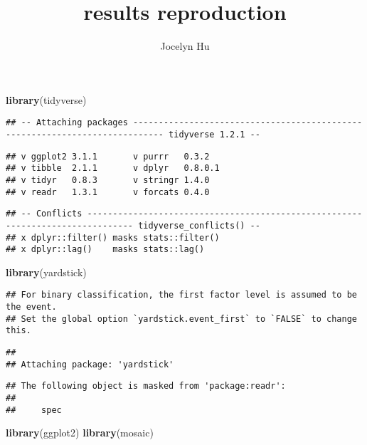 \documentclass[]{article}
\title{results reproduction}
\author{Jocelyn Hu}
\date{}
\newenvironment{Shaded}{\begin{snugshade}}{\end{snugshade}}
\newcommand{\KeywordTok}[1]{\textcolor[rgb]{0.13,0.29,0.53}{\textbf{#1}}}
\newcommand{\NormalTok}[1]{#1}
\begin{document}
\maketitle

\begin{Shaded}
\begin{Highlighting}[]
\KeywordTok{library}\NormalTok{(tidyverse)}
\end{Highlighting}
\end{Shaded}

\begin{verbatim}
## -- Attaching packages ---------------------------------------------------------------------------- tidyverse 1.2.1 --
\end{verbatim}

\begin{verbatim}
## v ggplot2 3.1.1       v purrr   0.3.2  
## v tibble  2.1.1       v dplyr   0.8.0.1
## v tidyr   0.8.3       v stringr 1.4.0  
## v readr   1.3.1       v forcats 0.4.0
\end{verbatim}

\begin{verbatim}
## -- Conflicts ------------------------------------------------------------------------------- tidyverse_conflicts() --
## x dplyr::filter() masks stats::filter()
## x dplyr::lag()    masks stats::lag()
\end{verbatim}

\begin{Shaded}
\begin{Highlighting}[]
\KeywordTok{library}\NormalTok{(yardstick)}
\end{Highlighting}
\end{Shaded}

\begin{verbatim}
## For binary classification, the first factor level is assumed to be the event.
## Set the global option `yardstick.event_first` to `FALSE` to change this.
\end{verbatim}

\begin{verbatim}
## 
## Attaching package: 'yardstick'
\end{verbatim}

\begin{verbatim}
## The following object is masked from 'package:readr':
## 
##     spec
\end{verbatim}

\begin{Shaded}
\begin{Highlighting}[]
\KeywordTok{library}\NormalTok{(ggplot2)}
\KeywordTok{library}\NormalTok{(mosaic)}
\end{Highlighting}
\end{Shaded}
\end{document}
